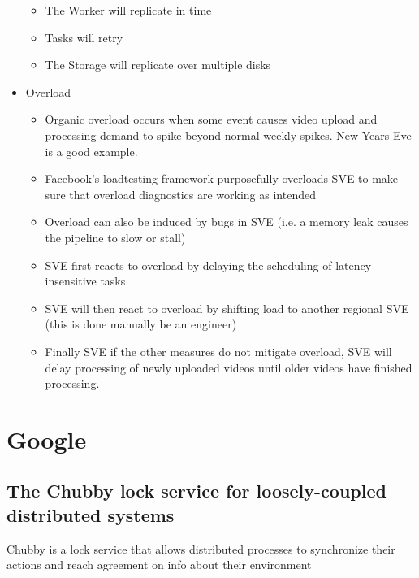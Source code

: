 \documentclass[a4paper]{article}
\begin{document}
\begin{itemize}
\begin{itemize}
\item The Worker will replicate in time

\item Tasks will retry

\item The Storage will replicate over multiple disks

\end{itemize}


\item Overload
\begin{itemize}
\item Organic overload occurs when some event causes video upload and processing demand to spike beyond normal weekly spikes. New Years Eve is a good example.

\item Facebook's loadtesting framework purposefully overloads SVE to make sure that overload diagnostics are working as intended

\item Overload can also be induced by bugs in SVE (i.e. a memory leak causes the pipeline to slow or stall)

\item SVE first reacts to overload by delaying the scheduling of latency-insensitive tasks

\item SVE will then react to overload by shifting load to another regional SVE (this is done manually be an engineer)

\item Finally SVE if the other measures do not mitigate overload, SVE will delay processing of newly uploaded videos until older videos have finished processing.
\end{itemize}


\end{itemize}


\section{Google}

\subsection{The Chubby lock service for loosely-coupled distributed systems}

Chubby is a lock service that allows distributed processes to synchronize their actions and reach agreement on info about their environment
\end{document}
